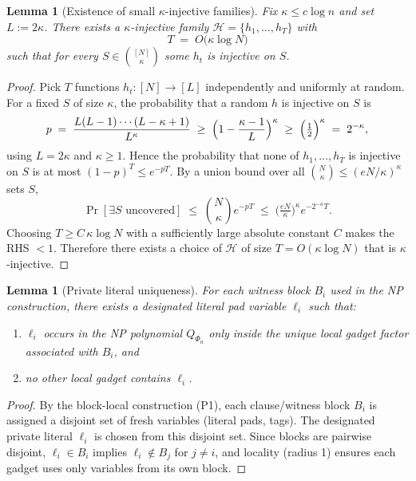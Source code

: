 \documentclass[12pt]{article}
\newtheorem{lemma}[theorem]{Lemma}
\theoremstyle{definition}
\theoremstyle{definition}
\theoremstyle{remark}
\theoremstyle{remark}
\begin{document}
\begin{lemma}[Existence of small $\kappa$-injective families]
\label{lem:k-injective-family}
Fix $\kappa\le c\log n$ and set $L:=2\kappa$.
There exists a $\kappa$-injective family $\mathcal H=\{h_1,\ldots,h_T\}$ with
\[
T \;=\; O\!\big(\kappa\log N\big)
\]
such that for every $S\in\binom{[N]}{\kappa}$ some $h_t$ is injective on $S$.
\end{lemma}

\begin{proof}
Pick $T$ functions $h_t:[N]\to[L]$ independently and uniformly at random.
For a fixed $S$ of size $\kappa$, the probability that a random $h$ is injective on $S$ is
\[
p \;=\; \frac{L(L-1)\cdots(L-\kappa+1)}{L^\kappa}
\;\ge\; \Bigl(1-\frac{\kappa-1}{L}\Bigr)^\kappa
\;\ge\; \Bigl(\tfrac{1}{2}\Bigr)^\kappa \;=\; 2^{-\kappa},
\]
using $L=2\kappa$ and $\kappa\ge 1$.
Hence the probability that none of $h_1,\ldots,h_T$ is injective on $S$ is at most $(1-p)^T\le e^{-pT}$.
By a union bound over all $\binom{N}{\kappa}\le (eN/\kappa)^\kappa$ sets $S$,
\[
\Pr[\exists S \text{ uncovered}] \;\le\; \binom{N}{\kappa} e^{-pT}
\;\le\; \bigl(\tfrac{eN}{\kappa}\bigr)^\kappa e^{-2^{-\kappa}T}.
\]
Choosing $T \ge C\,\kappa\log N$ with a sufficiently large absolute constant $C$ makes the RHS $<1$.
Therefore there exists a choice of $\mathcal H$ of size $T=O(\kappa\log N)$ that is $\kappa$-injective.
\end{proof}


\begin{lemma}[Private literal uniqueness]
\label{lem:private-literal-unique}
For each witness block $B_i$ used in the NP construction, there exists a designated
literal pad variable $\ell_i$ such that:
\begin{enumerate}
\item[(i)] $\ell_i$ occurs in the NP polynomial $Q_{\Phi_n}$ only inside the unique local gadget
factor associated with $B_i$, and
\item[(ii)] no other local gadget contains $\ell_i$.
\end{enumerate}
\end{lemma}

\begin{proof}
By the block-local construction (P1), each clause/witness block $B_i$ is assigned a disjoint set of
fresh variables (literal pads, tags). The designated private literal $\ell_i$ is chosen from this
disjoint set. Since blocks are pairwise disjoint, $\ell_i \in B_i$ implies $\ell_i \notin B_j$ for
$j \neq i$, and locality (radius 1) ensures each gadget uses only variables from its own block.
\end{proof}
\end{document}
